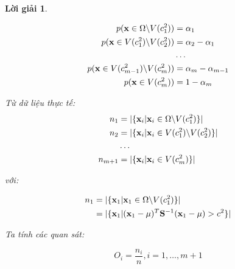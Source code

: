 \documentclass[14pt, a4paper]{article}
\theoremstyle{sltheorem}
\theoremstyle{soltheorem}
\newtheorem*{loigiai}{Lời giải}
\begin{document}
\begin{loigiai}
\begin{itemize}
        \begin{equation*}
            \begin{aligned}
                p(\bold{x} \in \Omega \backslash V(c_1^2)) &= \alpha_1 \\
                p(\bold{x} \in V(c_1^2) \backslash V(c_2^2)) &= \alpha_2 - \alpha_1 \\
                &\dots \\
                p(\bold{x} \in V(c_{m-1}^2) \backslash V(c_m^2)) &= \alpha_m - \alpha_{m-1} \\
                p(\bold{x} \in V(c_m^2)) &= 1 - \alpha_m
            \end{aligned}
        \end{equation*}

        Từ dữ liệu thực tế:
        \begin{equation*}
            \begin{aligned}
                n_1 &= \lvert \lbrace \bold{x}_i \vert \bold{x}_i \in \Omega \backslash V(c_1^2) \rbrace \rvert \\
                n_2 &= \lvert \lbrace \bold{x}_i \vert \bold{x}_i \in V(c_1^2) \backslash V(c_2^2) \rbrace \rvert \\
                &\dots \\
                n_{m+1} &= \lvert \lbrace \bold{x}_i \vert \bold{x}_i \in  V(c_m^2) \rbrace \rvert \\
            \end{aligned}
        \end{equation*}

        với:

        \begin{equation*}
            \begin{aligned}
                n_1 &= \lvert \lbrace \bold{x}_1 \vert \bold{x}_1 \in \Omega \backslash V(c_1^2) \rbrace \rvert \\
                &=\lvert \lbrace \bold{x}_1 \vert (\bold{x}_1 - \bold{\mu})^T \bold{S}^{-1} (\bold{x}_1 - \bold{\mu}) > c^2  \rbrace \rvert
            \end{aligned}
        \end{equation*}
    \end{itemize}

    Ta tính các quan sát:

    \begin{equation*}
        O_i = \dfrac{n_i}{n}, i=1, \dots, m+1
    \end{equation*}


\end{loigiai}
\end{document}
